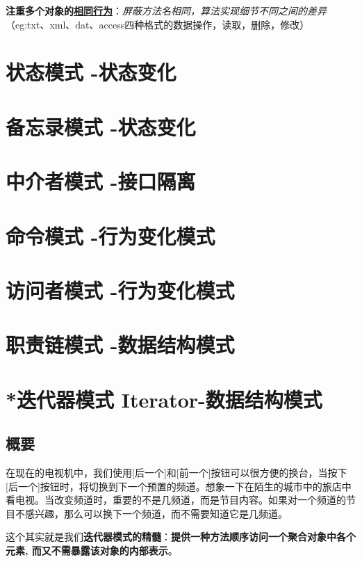 \documentclass[UTF8,a4paper,12pt]{ctexbook}
\begin{document}
			\textbf{注重多个对象的\underline{相同行为}}：\textit{屏蔽方法名相同，算法实现细节不同之间的差异}（eg:txt、xml、dat、access四种格式的数据操作，读取，删除，修改）
			
			
\newpage
\section{状态模式 -状态变化}

\newpage
\section{备忘录模式 -状态变化}

\newpage
\section{中介者模式 -接口隔离}

\newpage
\section{命令模式 -行为变化模式}

\newpage
\section{访问者模式 -行为变化模式}

\newpage
\section{职责链模式 -数据结构模式}

\newpage
\section{*迭代器模式 Iterator-数据结构模式}
	\subsection{概要}
		在现在的电视机中，我们使用[后一个]和[前一个]按钮可以很方便的换台，当按下[后一个]按钮时，将切换到下一个预置的频道。想象一下在陌生的城市中的旅店中看电视。当改变频道时，重要的不是几频道，而是节目内容。如果对一个频道的节目不感兴趣，那么可以换下一个频道，而不需要知道它是几频道。
		
		这个其实就是我们\textbf{迭代器模式的精髓}：\textbf{提供一种方法顺序访问一个聚合对象中各个元素, 而又不需暴露该对象的内部表示}。
	
\end{document}
